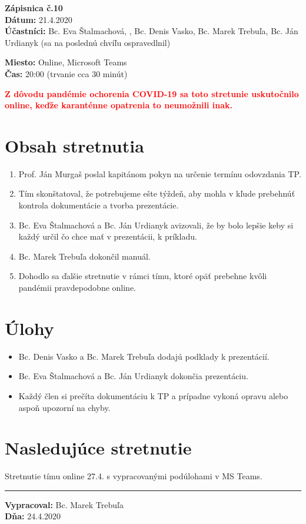 
\usepackage{parskip}%
\usepackage[dvipsnames]{xcolor}

	\textbf{{\Huge Zápisnica č.10}}\\
			
	\textbf{Dátum:} 21.4.2020\\	
		
	\textbf{Účastníci:} Bc. Eva Štalmachová, , Bc. Denis Vasko, Bc. Marek Trebuľa, Bc. Ján Urdianyk (sa na poslednú chvíľu ospravedlnil)

	\textbf{Miesto:} Online, Microsoft Teams\\	
	
	\textbf{Čas:} 20:00 (trvanie cca 30 minút)
	
	\textbf{\textcolor{red}{Z dôvodu pandémie ochorenia COVID-19 sa toto stretunie uskutočnilo online, keďže karanténne opatrenia to neumožnili inak.}}   
    \section*{Obsah stretnutia}
    \begin{enumerate}
    	\item Prof. Ján Murgaš poslal kapitánom pokyn na určenie termínu odovzdania TP.
    	\item Tím skonštatoval, že potrebujeme ešte týždeň, aby mohla v kľude prebehnúť kontrola dokumentácie a tvorba prezentácie.
    	\item Bc. Eva Štalmachová a Bc. Ján Urdianyk avizovali, že by bolo lepšie keby si každý určil čo chce mať v prezentácii, k príkladu.
    	\item Bc. Marek Trebuľa dokončil manuál.
    	\item Dohodlo sa ďalšie stretnutie v rámci tímu, ktoré opäť prebehne kvôli pandémii pravdepodobne online.
    \end{enumerate}    
    \section*{Úlohy}
    \begin{itemize}
    	\item Bc. Denis Vasko a Bc. Marek Trebuľa dodajú podklady k prezentácií.
    	\item Bc. Eva Štalmachová a Bc. Ján Urdianyk dokončia prezentáciu.
    	\item Každý člen si prečíta dokumentáciu k TP a prípadne vykoná opravu alebo aspoň upozorní na chyby. 
    \end{itemize}

    \section*{Nasledujúce stretnutie}
    
    Stretnutie tímu online 27.4. s vypracovanými podúlohami v MS Teams.

    
    \noindent\rule{15cm}{0.4pt}
   {\small 	\textbf{Vypracoval:} Bc. Marek Trebuľa\\
   \textbf{Dňa:} 24.4.2020 }
    

